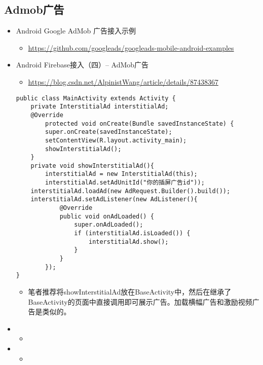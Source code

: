 \documentclass[9pt, b5paper]{article}
\begin{document}
\subsection{Admob广告}
\label{sec-3-4}
\begin{itemize}
\item Android Google AdMob 广告接入示例
\begin{itemize}
\item \url{https://github.com/googleads/googleads-mobile-android-examples}
\end{itemize}
\item Android Firebase接入（四）-- AdMob广告
\begin{itemize}
\item \url{https://blog.csdn.net/AlpinistWang/article/details/87438367}
\end{itemize}
\begin{verbatim}
public class MainActivity extends Activity {
    private InterstitialAd interstitialAd;
    @Override
        protected void onCreate(Bundle savedInstanceState) {
        super.onCreate(savedInstanceState);
        setContentView(R.layout.activity_main);
        showInterstitialAd();
    }
    private void showInterstitialAd(){
        interstitialAd = new InterstitialAd(this);
        interstitialAd.setAdUnitId("你的插屏广告id"));
    interstitialAd.loadAd(new AdRequest.Builder().build());
    interstitialAd.setAdListener(new AdListener(){
            @Override
            public void onAdLoaded() {
                super.onAdLoaded();
                if (interstitialAd.isLoaded()) {
                    interstitialAd.show();
                }
            }
        });
}
\end{verbatim}
\begin{itemize}
\item 笔者推荐将showInterstitialAd放在BaseActivity中，然后在继承了BaseActivity的页面中直接调用即可展示广告。加载横幅广告和激励视频广告是类似的。
\end{itemize}
\item \begin{itemize}
\item 
\end{itemize}
\item \begin{itemize}
\item 
\end{itemize}
\end{itemize}
\end{document}
